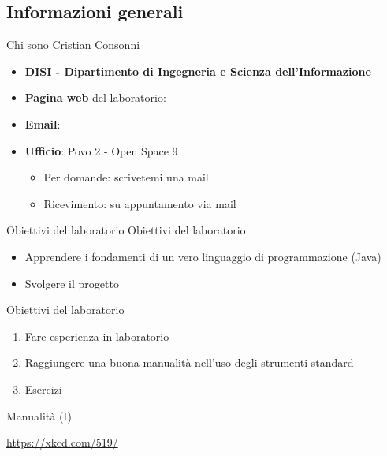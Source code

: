 \subsection[Informazioni generali]{Informazioni generali}

\begin{frame}{Chi sono}
  Cristian Consonni

  \begin{itemize}
    \item \textbf{DISI - Dipartimento di Ingegneria e Scienza dell'Informazione}
    \item \textbf{Pagina web} del laboratorio: 
    \item \textbf{Email}: 
    \item \textbf{Ufficio}: Povo 2 - Open Space 9
      \begin{itemize}
	\item Per domande: scrivetemi una mail
	\item Ricevimento: su appuntamento via mail
      \end{itemize}
  \end{itemize}
\end{frame}



\begin{frame}{Obiettivi del laboratorio}
  Obiettivi del laboratorio:
  \begin{itemize}
    \item Apprendere i fondamenti di un vero linguaggio di programmazione (Java)
    \item Svolgere il progetto
  \end{itemize}

  Obiettivi del laboratorio
  \begin{enumerate}
    \item Fare esperienza in laboratorio
    \item Raggiungere una buona manualità nell'uso degli strumenti standard
    \item Esercizi
  \end{enumerate}

\end{frame}

\begin{frame}{Manualità (I)}
  \begin{center}
  \end{center}
  \url{https://xkcd.com/519/}
\end{frame}

